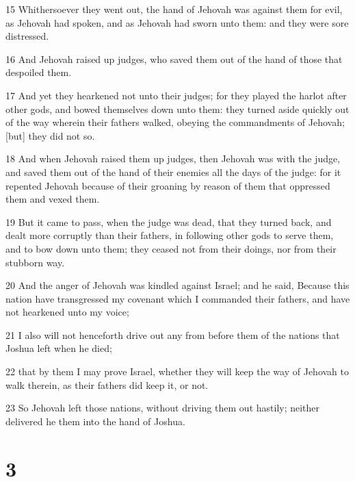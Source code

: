 \par 15 Whithersoever they went out, the hand of Jehovah was against them for evil, as Jehovah had spoken, and as Jehovah had sworn unto them: and they were sore distressed.
\par 16 And Jehovah raised up judges, who saved them out of the hand of those that despoiled them.
\par 17 And yet they hearkened not unto their judges; for they played the harlot after other gods, and bowed themselves down unto them: they turned aside quickly out of the way wherein their fathers walked, obeying the commandments of Jehovah; [but] they did not so.
\par 18 And when Jehovah raised them up judges, then Jehovah was with the judge, and saved them out of the hand of their enemies all the days of the judge: for it repented Jehovah because of their groaning by reason of them that oppressed them and vexed them.
\par 19 But it came to pass, when the judge was dead, that they turned back, and dealt more corruptly than their fathers, in following other gods to serve them, and to bow down unto them; they ceased not from their doings, nor from their stubborn way.
\par 20 And the anger of Jehovah was kindled against Israel; and he said, Because this nation have transgressed my covenant which I commanded their fathers, and have not hearkened unto my voice;
\par 21 I also will not henceforth drive out any from before them of the nations that Joshua left when he died;
\par 22 that by them I may prove Israel, whether they will keep the way of Jehovah to walk therein, as their fathers did keep it, or not.
\par 23 So Jehovah left those nations, without driving them out hastily; neither delivered he them into the hand of Joshua.

\chapter{3}

